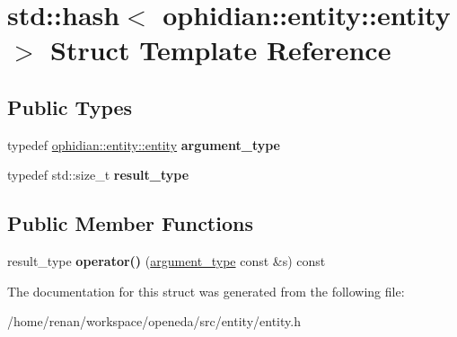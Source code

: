 \hypertarget{structstd_1_1hash_3_01ophidian_1_1entity_1_1entity_01_4}{\section{std\-:\-:hash$<$ ophidian\-:\-:entity\-:\-:entity $>$ Struct Template Reference}
\label{structstd_1_1hash_3_01ophidian_1_1entity_1_1entity_01_4}
}
\subsection*{Public Types}
\begin{DoxyCompactItemize}
\item 
\hypertarget{structstd_1_1hash_3_01ophidian_1_1entity_1_1entity_01_4_a962977e059f57f53570cb2f896ccff92}{typedef \hyperlink{classophidian_1_1entity_1_1entity}{ophidian\-::entity\-::entity} {\bfseries argument\-\_\-type}}\label{structstd_1_1hash_3_01ophidian_1_1entity_1_1entity_01_4_a962977e059f57f53570cb2f896ccff92}

\item 
\hypertarget{structstd_1_1hash_3_01ophidian_1_1entity_1_1entity_01_4_a3a6a4299036b66555fdf3dcb7914ca18}{typedef std\-::size\-\_\-t {\bfseries result\-\_\-type}}\label{structstd_1_1hash_3_01ophidian_1_1entity_1_1entity_01_4_a3a6a4299036b66555fdf3dcb7914ca18}

\end{DoxyCompactItemize}
\subsection*{Public Member Functions}
\begin{DoxyCompactItemize}
\item 
\hypertarget{structstd_1_1hash_3_01ophidian_1_1entity_1_1entity_01_4_a13878f35a7c52951ae78742fc7335622}{result\-\_\-type {\bfseries operator()} (\hyperlink{classophidian_1_1entity_1_1entity}{argument\-\_\-type} const \&s) const }\label{structstd_1_1hash_3_01ophidian_1_1entity_1_1entity_01_4_a13878f35a7c52951ae78742fc7335622}

\end{DoxyCompactItemize}


The documentation for this struct was generated from the following file\-:\begin{DoxyCompactItemize}
\item 
/home/renan/workspace/openeda/src/entity/entity.\-h\end{DoxyCompactItemize}
